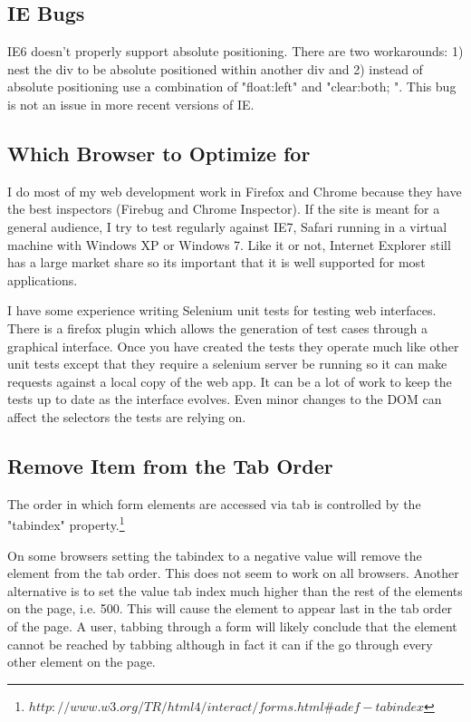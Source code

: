 \documentclass[12pt]{amsart}
\begin{document}
\subsection{IE Bugs}


IE6 doesn't properly support absolute positioning. There are two workarounds: 1) nest the div to be absolute positioned within another div and 2) instead of absolute positioning use a combination of "float:left" and "clear:both; ". This bug is not an issue in more recent versions of IE.


\subsection{Which Browser to Optimize for}

I do most of my web development work in Firefox and Chrome because they have the best inspectors (Firebug and Chrome Inspector). If the site is meant for a general audience, I try to test regularly against IE7, Safari running in a virtual machine with Windows XP or Windows 7. Like it or not, Internet Explorer still has a large market share so its important that it is well supported for most applications.

I have some experience writing Selenium unit tests for testing web interfaces. There is a firefox plugin which allows the generation of test cases through a graphical interface. Once you have created the tests they operate much like other unit tests except that they require a selenium server be running so it can make requests against a local copy of the web app. It can be a lot of work to keep the tests up to date as the interface evolves. Even minor changes to the DOM can affect the selectors the tests are relying on. 


\subsection{Remove Item from the Tab Order}

The order in which form elements are accessed via tab is controlled by the "tabindex" property.\footnote[4]{$http://www.w3.org/TR/html4/interact/forms.html\#adef-tabindex$}

On some browsers setting the tabindex to a negative value will remove the element from the tab order. This does not seem to work on all browsers. Another alternative is to set the value tab index much higher than the rest of the elements on the page, i.e. 500. This will cause the element to appear last in the tab order of the page. A user, tabbing through a form will likely conclude that the element cannot be reached by tabbing although in fact it can if the go through every other element on the page.
\end{document}
